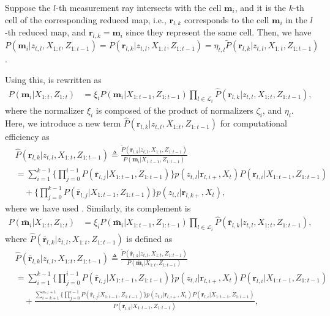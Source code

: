 Suppose the $l$-th measurement ray intersects with the cell $\mathbf{m}_i$, and it is the $k$-th cell of the corresponding reduced map, i.e., $\mathbf{r}_{l,k}$ corresponds to the cell $\mathbf{m}_i$ in the $l$-th reduced map, and $\mathbf{r}_{l,k}=\mathbf{m}_i$ since they represent the same cell.  Then, we have $P(\mathbf{m}_i|z_{t,l},X_{1:t},Z_{1:t-1})=P(\mathbf{r}_{l,k}|z_{t,l},X_{1:t},Z_{1:t-1})=\eta_{t,l}\tilde P(\mathbf{r}_{l,k}|z_{t,l},X_{1:t},Z_{1:t-1})$. 

\sloppy Using this,  is rewritten as
\begin{align}
P(\mathbf{m}_i|X_{1:t},Z_{1:t})
&=\xi_i P(\mathbf{m}_i|{X_{1:t-1}},Z_{1:t-1})
\prod_{l\in\mathcal L_i}
\hat P(\mathbf{r}_{l,k}|z_{t,l},X_{1:t},Z_{1:t-1})
,
\label{eqn:ISM_Fusion}
\end{align}
where the normalizer $\xi_i$ is composed of the product of normalizers $\zeta_i$, and $\eta_i$. Here, we introduce a new term $\hat P(\mathbf{r}_{l,k}|z_{t,l},X_{1:t},Z_{1:t-1})$ for computational efficiency as
\begin{align}
&\hat P(\mathbf{r}_{l,k}|z_{t,l},X_{1:t},Z_{1:t-1})
\triangleq \frac{\tilde P(\mathbf{r}_{l,k}|z_{t,l},X_{1:t},Z_{1:t-1})}{P(\mathbf{m}_i|X_{1:t-1},Z_{1:t-1})}
\nonumber\\&=
\sum_{i=1}^{k-1}\bigg\{\prod_{j=0}^{i-1}P(\bar{\mathbf{r}}_{l,j}|X_{1:t-1},Z_{1:t-1})\bigg\}p(z_{t,l}|\mathbf{r}_{l,i+},X_t)P(\mathbf{r}_{l,i}|X_{1:t-1},Z_{1:t-1})
\nonumber\\&\quad
+
\bigg\{\prod_{j=0}^{k-1}P(\bar{\mathbf{r}}_{l,j}|X_{1:t-1},Z_{1:t-1})\bigg\}p(z_{t,l}|\mathbf{r}_{l,k+},X_t),
\end{align}
where we have used . Similarly, its complement is
\begin{align}
P(\bar{\mathbf{m}}_i|{{X_{1:t}}},Z_{1:t})
&=\xi_i P(\bar{\mathbf{m}}_i|{X_{1:t-1}},Z_{1:t-1})
\prod_{l\in\mathcal L_i}
\hat P(\bar{\mathbf{r}}_{l,k}|z_{t,l},X_{1:t},Z_{1:t-1})
,
\label{eqn:ISM_Bar_Fusion}
\end{align}
where $\hat P(\bar{\mathbf{r}}_{l,k}|z_{t,l},X_{1:t},Z_{1:t-1})$ is defined as
\begin{align}
&\hat P(\bar{\mathbf{r}}_{l,k}|z_{t,l},X_{1:t},Z_{1:t-1})
\triangleq\frac{\tilde P(\bar{\mathbf{r}}_{l,k}|z_{t,l},X_{1:t},Z_{1:t-1})}{P(\bar{\mathbf{m}}_i|X_{1:t},Z_{1:t-1})}
\nonumber\\
&=\sum_{i=1}^{k-1}\bigg\{\prod_{j=0}^{i-1}P(\bar{\mathbf{r}}_{l,j}|X_{1:t-1},Z_{1:t-1})\bigg\} p(z_{t,l}|\mathbf{r}_{l,i+},X_t)P(\mathbf{r}_{l,i}|X_{1:t-1},Z_{1:t-1})
\nonumber
\\
&\quad
+\frac{
\sum_{i=k+1}^{n_{r,l}+1}\bigg\{\prod_{j=0}^{i-1}P(\bar{\mathbf{r}}_{l,j}|X_{1:t-1},Z_{1:t-1})\bigg\}p(z_{t,l}|\mathbf{r}_{l,i+},X_t)P(\mathbf{r}_{l,i}|X_{1:t-1},Z_{1:t-1})}{P(\bar{\mathbf{r}}_{l,k}|X_{1:t-1},Z_{1:t-1})},
\end{align}
